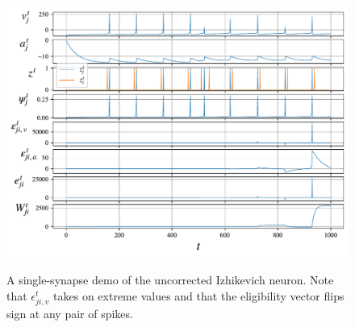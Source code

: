 \begin{figure}[ht]
    \centering
    \includegraphics[width=\linewidth]{gfx/demo_izh}
    \label{fig:demo_izh}
    \caption{A single-synapse demo of the uncorrected Izhikevich neuron. Note that $\epsilon^t_{ji, v}$ takes on extreme values and that the eligibility vector flips sign at any pair of spikes.}
\end{figure}
